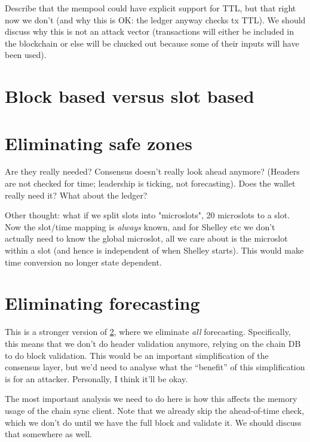 Describe that the mempool could have explicit support for TTL, but that right now we don't (and why this is OK: the ledger anyway checks tx TTL). We should discuss why this is not an attack vector (transactions will either be included in the blockchain or else will be chucked out because some of their inputs will have been used).

\section{Block based versus slot based}
\label{future:block-vs-slot}

\section{Eliminating safe zones}
\label{future:eliminating-safezones}

Are they really needed? Consensus doesn't really look ahead anymore?
(Headers are not checked for time; leadership is ticking, not forecasting).
Does the wallet really need it? What about the ledger?

Other thought: what if we split slots into "microslots", 20 microslots to a
slot. Now the slot/time mapping is \emph{always} known, and for Shelley etc
we don't actually need to know the global microslot, all we care about is
the microslot within a slot (and hence is independent of when Shelley starts).
This would make time conversion no longer state dependent.

\section{Eliminating forecasting}
\label{future:eliminating-forecasting}

This is a stronger version of \cref{future:eliminating-safezones}, where
we eliminate \emph{all} forecasting. Specifically, this means that we don't
do header validation anymore, relying on the chain DB to do block validation.
This would be an important simplification of the consensus layer, but we'd
need to analyse what the ``benefit'' of this simplification is for an
attacker. Personally, I think it'll be okay.

The most important analysis we need to do here is how this affects the memory
usage of the chain sync client. Note that we already skip the ahead-of-time
check, which we don't do until we have the full block and validate it. We
should discuss that somewhere as well.

